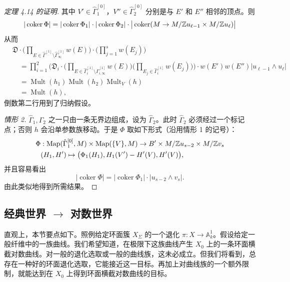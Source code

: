 \begin{proof}[定理 4.14 的证明]
其中 $V'\in\hat\Gamma_1^{[0]}$，$V''\in\hat\Gamma_2^{[0]}$ 分别是与 $E'$ 和 $E''$ 相邻的顶点。则
\[
|\operatorname{coker}\Phi|=|\operatorname{coker}\Phi_1|\cdot|\operatorname{coker}\Phi_2|\cdot\big|\operatorname{coker}(M\to M/\mathbb{Z} u_{\ell-1}\times M/\mathbb{Z} u_\ell)\big|
\]
从而
\begin{align*}
&\mathfrak{D}\cdot\Big(\prod_{E\in\hat\Gamma^{[1]}\setminus\hat\Gamma^{[1]}_\infty}w(E)\Big)\cdot\Big(\prod_{j=1}^sw(E_j)\Big)\\
&\quad=\prod_{i=1}^2\Bigg(\mathfrak{D}_i\cdot\Big(\prod_{E\in\hat\Gamma_i^{[1]}\setminus\hat\Gamma_{i,\infty}^{[1]}}w(E)\Big)\Big(\prod_{E_j\in\hat\Gamma_i^{[1]}}w(E_j)\Big)\Bigg)\cdot w(E')w(E'')|u_{\ell-1}\wedge u_\ell|\\
&\quad=\operatorname{Mult}(h_1)\operatorname{Mult}(h_2)\operatorname{Mult}_V(h)\\
&\quad=\operatorname{Mult}(h),
\end{align*}
倒数第二行用到了归纳假设。

\emph{情形 2.} $\hat\Gamma_1,\hat\Gamma_2$ 之一只由一条无界边组成，设为 $\hat\Gamma_2$。此时 $\hat\Gamma_2$ 必须经过一个标记点；否则 $h$ 会沿单参数族移动。于是 $\Phi$ 取如下形式（沿用情形 1 的记号）：
\begin{align*}
\Phi&:\operatorname{Map}(\hat\Gamma_1^{[0]},M)\times\operatorname{Map}(\{V\},M)\to B'\times M/\mathbb{Z} u_{s-2}\times M/\mathbb{Z} v_s\\
&(H_1,H')\mapsto\big(\Phi_1(H_1),H_1(V')-H'(V),H'(V)\big),
\end{align*}
并且容易看出
\[
|\operatorname{coker}\Phi|=|\operatorname{coker}\Phi_1|\cdot|u_{s-2}\wedge v_s|.
\]
由此类似地得到所需结果。

\end{proof}

\subsection{经典世界 $\to$ 对数世界}

直观上，本节要点如下。照例给定环面簇 $X_\Sigma$ 的一个退化 $\pi:X\to\mathbb{A}^1_k$。假设给定一般纤维中的一族曲线。我们希望知道，在极限下这族曲线产生 $X_0$ 上的一条环面横截对数曲线。对一般的退化选取或一般的曲线族，这未必成立。但我们将看到，总存在一种好的环面退化选取，它能接近这一目标。再加上对曲线族的一个额外限制，就能达到在 $X_0$ 上得到环面横截对数曲线的目标。

